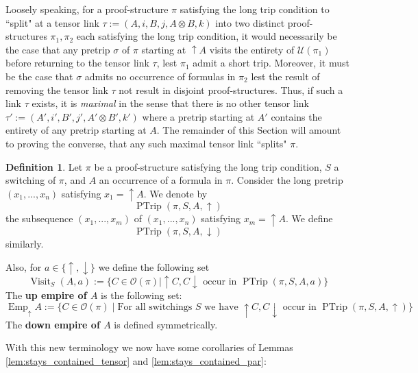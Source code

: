 \documentclass[12pt]{article}
\theoremstyle{plain}
\theoremstyle{definition}
\newtheorem{defn}[thm]{Definition} %
\newcommand{\call}[1]{\mathcal{#1}}
\begin{document}
Loosely speaking, for a proof-structure $\pi$ satisfying the long trip condition to ``split" at a tensor link $\tau := (A,i,B,j,A\otimes B,k)$ into two distinct proof-structures $\pi_1,\pi_2$ each satisfying the long trip condition, it would necessarily be the case that any pretrip $\sigma$ of $\pi$ starting at $\uparrow A$ visits the entirety of $\call{U}(\pi_1)$ before returning to the tensor link $\tau$, lest $\pi_1$ admit a short trip. Moreover, it must be the case that $\sigma$ admits no occurrence of formulas in $\pi_2$ lest the result of removing the tensor link $\tau$ not result in disjoint proof-structures. Thus, if such a link $\tau$ exists, it is \emph{maximal} in the sense that there is no other tensor link $\tau' := (A',i',B',j',A' \otimes B',k')$ where a pretrip starting at $A'$ contains the entirety of any pretrip starting at $A$. The remainder of this Section will amount to proving the converse, that any such maximal tensor link ``splits" $\pi$.
\begin{defn}\label{def:pretrip_from_A}
Let $\pi$ be a proof-structure satisfying the long trip condition, $S$ a switching of $\pi$, and $A$ an occurrence of a formula in $\pi$. Consider the long pretrip $(x_1,...,x_n)$ satisfying $x_1 = \uparrow A$. We denote by
\begin{equation}
    \operatorname{PTrip}(\pi,S,A,\uparrow)
\end{equation}
the subsequence $(x_1,...,x_m)$ of $(x_1,...,x_n)$ satisfying $x_m = \uparrow A$. We define
\begin{equation}
    \operatorname{PTrip}(\pi, S, A, \downarrow)
\end{equation}
similarly.

Also, for $a \in \lbrace \uparrow,\downarrow\rbrace $ we define the following set
\begin{equation}
    \operatorname{Visit}_S(A,a) := \lbrace C \in \call{O}(\pi) \mid \uparrow C, C\downarrow \text{ occur in } \operatorname{PTrip}(\pi,S,A,a)\rbrace
\end{equation}
The \textbf{up empire of $A$} is the following set:
\begin{equation}
    \operatorname{Emp}_{\uparrow}A := \lbrace C \in \call{O}(\pi) \mid \text{For all switchings }S\text{ we have } \uparrow C, C\downarrow \text{ occur in } \operatorname{PTrip}(\pi,S, A,\uparrow)\rbrace
\end{equation}
The \textbf{down empire of $A$} is defined symmetrically.
\end{defn}
With this new terminology we now have some corollaries of Lemmas \ref{lem:stays_contained_tensor} and \ref{lem:stays_contained_par}:
\end{document}
